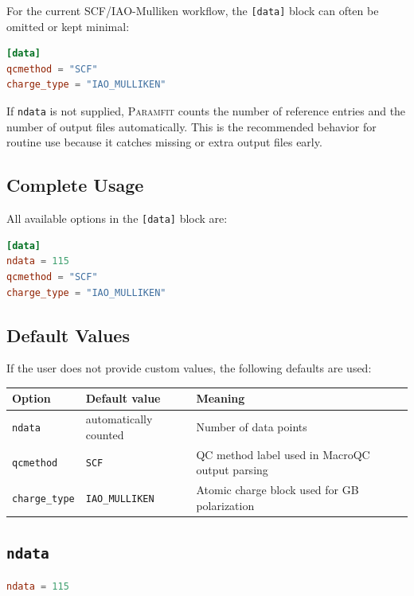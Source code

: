 \documentclass[11pt]{article}
\begin{document}
For the current SCF/IAO-Mulliken workflow, the \texttt{[data]} block can often
be omitted or kept minimal:

\begin{lstlisting}[language=toml]
[data]
qcmethod = "SCF"
charge_type = "IAO_MULLIKEN"
\end{lstlisting}

If \texttt{ndata} is not supplied, \textsc{Paramfit} counts the number of
reference entries and the number of output files automatically. This is the
recommended behavior for routine use because it catches missing or extra output
files early.

\subsection{Complete Usage}

All available options in the \texttt{[data]} block are:

\begin{lstlisting}[language=toml]
[data]
ndata = 115
qcmethod = "SCF"
charge_type = "IAO_MULLIKEN"
\end{lstlisting}

\subsection{Default Values}

If the user does not provide custom values, the following defaults are used:

\begin{center}
\begin{tabular}{lll}
\toprule
Option & Default value & Meaning \\
\midrule
\texttt{ndata} & automatically counted & Number of data points \\
\texttt{qcmethod} & \texttt{SCF} & QC method label used in MacroQC output parsing \\
\texttt{charge\_type} & \texttt{IAO\_MULLIKEN} & Atomic charge block used for GB polarization \\
\bottomrule
\end{tabular}
\end{center}

\subsection{\texttt{ndata}}

\begin{lstlisting}[language=toml]
ndata = 115
\end{lstlisting}
\end{document}
